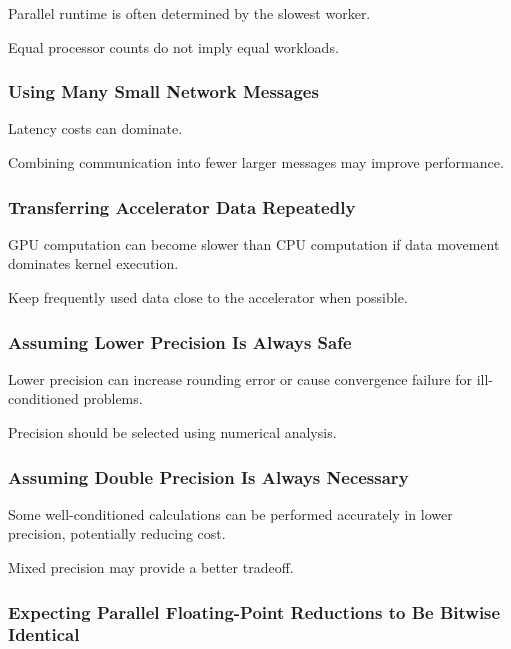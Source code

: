 Parallel runtime is often determined by the slowest worker.

Equal processor counts do not imply equal workloads.

\subsubsection{Using Many Small Network Messages}

Latency costs can dominate.

Combining communication into fewer larger messages may improve
performance.

\subsubsection{Transferring Accelerator Data Repeatedly}

GPU computation can become slower than CPU computation if data movement
dominates kernel execution.

Keep frequently used data close to the accelerator when possible.

\subsubsection{Assuming Lower Precision Is Always Safe}

Lower precision can increase rounding error or cause convergence failure
for ill-conditioned problems.

Precision should be selected using numerical analysis.

\subsubsection{Assuming Double Precision Is Always Necessary}

Some well-conditioned calculations can be performed accurately in lower
precision, potentially reducing cost.

Mixed precision may provide a better tradeoff.

\subsubsection{Expecting Parallel Floating-Point Reductions to Be Bitwise Identical}

